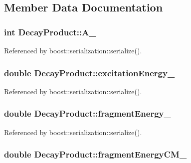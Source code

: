 \subsection{Member Data Documentation}
\hypertarget{classDecayProduct_af9a9277f843631c34ae9a333dc95e262}{
\subsubsection[{A\-\_\-}]{\setlength{\rightskip}{0pt plus 5cm}int Decay\-Product\-::\-A\-\_\-}}\label{classDecayProduct_af9a9277f843631c34ae9a333dc95e262}


Referenced by boost\-::serialization\-::serialize().

\hypertarget{classDecayProduct_af20a395130c97f542961ebe1117aa5fe}{
\subsubsection[{excitation\-Energy\-\_\-}]{\setlength{\rightskip}{0pt plus 5cm}double Decay\-Product\-::excitation\-Energy\-\_\-}}\label{classDecayProduct_af20a395130c97f542961ebe1117aa5fe}


Referenced by boost\-::serialization\-::serialize().

\hypertarget{classDecayProduct_a4020d3a3e616416e256bf3e0c9339db4}{
\subsubsection[{fragment\-Energy\-\_\-}]{\setlength{\rightskip}{0pt plus 5cm}double Decay\-Product\-::fragment\-Energy\-\_\-}}\label{classDecayProduct_a4020d3a3e616416e256bf3e0c9339db4}


Referenced by boost\-::serialization\-::serialize().

\hypertarget{classDecayProduct_aebe2996e188ca934c79176b642c94808}{
\subsubsection[{fragment\-Energy\-C\-M\-\_\-}]{\setlength{\rightskip}{0pt plus 5cm}double Decay\-Product\-::fragment\-Energy\-C\-M\-\_\-}}\label{classDecayProduct_aebe2996e188ca934c79176b642c94808}


